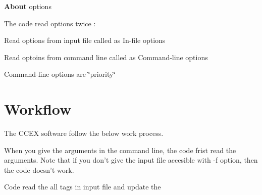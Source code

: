 {\bfseries About} options {\bfseries } 

The code read options twice \-:
\begin{DoxyItemize}
\item Read options from input file called as In-\/file options
\item Read optoins from command line called as Command-\/line options \par
 Command-\/line options are \char`\"{}priority\char`\"{}
\end{DoxyItemize}\hypertarget{GettingStarted_Workflow}{}\section{Workflow}\label{GettingStarted_Workflow}
The C\-C\-E\-X software follow the below work process.

When you give the arguments in the command line, the code frist read the arguments. Note that if you don't give the input file accesible with -\/f option, then the code doesn't work.

Code read the all tags in input file and update the

 